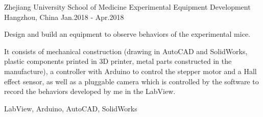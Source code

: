 
\begin{cventries}
	\cventry
	{Zhejiang University School of Medicine} %
	{Experimental Equipment Development}
	{Hangzhou, China} %
	{Jan.2018 - Apr.2018} %
	{
		\begin{cvitems} %
			\item {Design and build an equipment to observe behaviors of the experimental mice. }
			\item {	It consists of mechanical construction (drawing in AutoCAD and SolidWorks, plastic components printed in 3D printer, metal parts constructed in the manufacture), a controller with Arduino to control the stepper motor and a Hall effect sensor, as well as a pluggable camera which is controlled by the software to record the behaviors developed by me in the LabView.}
		\end{cvitems}
	}{LabView, Arduino, AutoCAD, SolidWorks}
	
\end{cventries}



